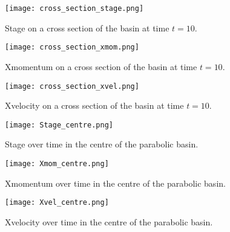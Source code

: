 \begin{figure}
\begin{center}
\texttt{[image: cross\_section\_stage.png]}
\caption{Stage on a cross section of the basin at time $t=10$.}
\label{fig:cross_section_stage}
\end{center}
\end{figure}

\begin{figure}
\begin{center}
\texttt{[image: cross\_section\_xmom.png]}
\caption{Xmomentum on a cross section of the basin at time $t=10$.}
\label{fig:cross_section_xmom}
\end{center}
\end{figure}

\begin{figure}
\begin{center}
\texttt{[image: cross\_section\_xvel.png]}
\caption{Xvelocity on a cross section of the basin at time $t=10$.}
\label{fig:cross_section_xvel}
\end{center}
\end{figure}




\begin{figure}
\begin{center}
\texttt{[image: Stage\_centre.png]}
\caption{Stage over time in the centre of the parabolic basin.}
\label{fig:Stage_centre}
\end{center}
\end{figure}

\begin{figure}
\begin{center}
\texttt{[image: Xmom\_centre.png]}
\caption{Xmomentum over time in the centre of the parabolic basin.}
\label{fig:Xmom_centre}
\end{center}
\end{figure}

\begin{figure}
\begin{center}
\texttt{[image: Xvel\_centre.png]}
\caption{Xvelocity over time in the centre of the parabolic basin.}
\label{fig:Xvel_centre}
\end{center}
\end{figure}


\endinput
